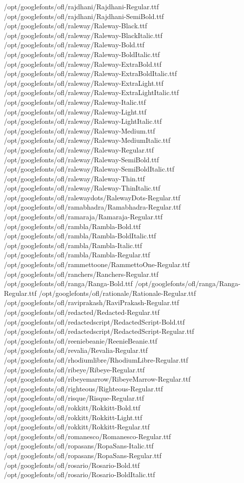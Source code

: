 /opt/googlefonts/ofl/rajdhani/Rajdhani-Regular.ttf
/opt/googlefonts/ofl/rajdhani/Rajdhani-SemiBold.ttf
/opt/googlefonts/ofl/raleway/Raleway-Black.ttf
/opt/googlefonts/ofl/raleway/Raleway-BlackItalic.ttf
/opt/googlefonts/ofl/raleway/Raleway-Bold.ttf
/opt/googlefonts/ofl/raleway/Raleway-BoldItalic.ttf
/opt/googlefonts/ofl/raleway/Raleway-ExtraBold.ttf
/opt/googlefonts/ofl/raleway/Raleway-ExtraBoldItalic.ttf
/opt/googlefonts/ofl/raleway/Raleway-ExtraLight.ttf
/opt/googlefonts/ofl/raleway/Raleway-ExtraLightItalic.ttf
/opt/googlefonts/ofl/raleway/Raleway-Italic.ttf
/opt/googlefonts/ofl/raleway/Raleway-Light.ttf
/opt/googlefonts/ofl/raleway/Raleway-LightItalic.ttf
/opt/googlefonts/ofl/raleway/Raleway-Medium.ttf
/opt/googlefonts/ofl/raleway/Raleway-MediumItalic.ttf
/opt/googlefonts/ofl/raleway/Raleway-Regular.ttf
/opt/googlefonts/ofl/raleway/Raleway-SemiBold.ttf
/opt/googlefonts/ofl/raleway/Raleway-SemiBoldItalic.ttf
/opt/googlefonts/ofl/raleway/Raleway-Thin.ttf
/opt/googlefonts/ofl/raleway/Raleway-ThinItalic.ttf
/opt/googlefonts/ofl/ralewaydots/RalewayDots-Regular.ttf
/opt/googlefonts/ofl/ramabhadra/Ramabhadra-Regular.ttf
/opt/googlefonts/ofl/ramaraja/Ramaraja-Regular.ttf
/opt/googlefonts/ofl/rambla/Rambla-Bold.ttf
/opt/googlefonts/ofl/rambla/Rambla-BoldItalic.ttf
/opt/googlefonts/ofl/rambla/Rambla-Italic.ttf
/opt/googlefonts/ofl/rambla/Rambla-Regular.ttf
/opt/googlefonts/ofl/rammettoone/RammettoOne-Regular.ttf
/opt/googlefonts/ofl/ranchers/Ranchers-Regular.ttf
/opt/googlefonts/ofl/ranga/Ranga-Bold.ttf
/opt/googlefonts/ofl/ranga/Ranga-Regular.ttf
/opt/googlefonts/ofl/rationale/Rationale-Regular.ttf
/opt/googlefonts/ofl/raviprakash/RaviPrakash-Regular.ttf
/opt/googlefonts/ofl/redacted/Redacted-Regular.ttf
/opt/googlefonts/ofl/redactedscript/RedactedScript-Bold.ttf
/opt/googlefonts/ofl/redactedscript/RedactedScript-Regular.ttf
/opt/googlefonts/ofl/reeniebeanie/ReenieBeanie.ttf
/opt/googlefonts/ofl/revalia/Revalia-Regular.ttf
/opt/googlefonts/ofl/rhodiumlibre/RhodiumLibre-Regular.ttf
/opt/googlefonts/ofl/ribeye/Ribeye-Regular.ttf
/opt/googlefonts/ofl/ribeyemarrow/RibeyeMarrow-Regular.ttf
/opt/googlefonts/ofl/righteous/Righteous-Regular.ttf
/opt/googlefonts/ofl/risque/Risque-Regular.ttf
/opt/googlefonts/ofl/rokkitt/Rokkitt-Bold.ttf
/opt/googlefonts/ofl/rokkitt/Rokkitt-Light.ttf
/opt/googlefonts/ofl/rokkitt/Rokkitt-Regular.ttf
/opt/googlefonts/ofl/romanesco/Romanesco-Regular.ttf
/opt/googlefonts/ofl/ropasans/RopaSans-Italic.ttf
/opt/googlefonts/ofl/ropasans/RopaSans-Regular.ttf
/opt/googlefonts/ofl/rosario/Rosario-Bold.ttf
/opt/googlefonts/ofl/rosario/Rosario-BoldItalic.ttf
